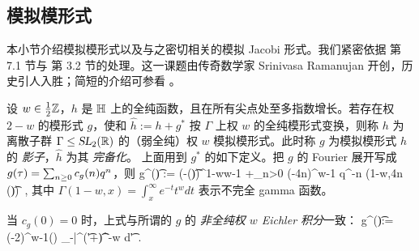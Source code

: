 \subsection{模拟模形式}
\label{subsec:MMF}

本小节介绍模拟模形式以及与之密切相关的模拟 Jacobi 形式。我们紧密依据 \cite{Dabholkar:2012nd} 第 7.1 节与 \cite{omjt} 第 3.2 节的处理。这一课题由传奇数学家 Srinivasa Ramanujan 开创，历史引人入胜；简短的介绍可参看 \cite{zagier_mock}。

设 $w\in \frac12\mathbb{Z}$，$h$ 是 $\mathbb{H}$ 上的全纯函数，且在所有尖点处至多指数增长。若存在权 $2-w$ 的模形式 $g$，使和 $\hat h:= h+ g^\ast$ 按 $\Gamma$ 上权 $w$ 的全纯模形式变换，则称 $h$ 为离散子群 $\Gamma \leq \operatorname{\textsl{SL}}_2(\mathbb{R})$ 的（弱全纯）权 $w$ 模拟模形式。此时称 $g$ 为模拟模形式 $h$ 的 {\em 影子}，$\hat h$ 为其 {\em 完备化}。
上面用到 $g^\ast$ 的如下定义。把 $g$ 的 Fourier 展开写成 $g(\tau) = \sum_{n\geq 0} c_g(n) q^n$，则
\be \label{def:int_shadow}
g^\ast(\t)  :=  {(-\Im(\t))^{1-w}\over w-1} +\sum_{n>0} (-4\p n)^{w-1} q^{-n} \Gamma(1-w,4\pi n \Im(\t))~,
\ee
其中 $\Gamma(1-w,x) = \int_{x}^{\infty} e^{-t} t^{w} dt$ 表示不完全 gamma 函数。



当 $c_g(0)=0$ 时，上式与所谓的 $g$ 的 {\em 非全纯权 $w$ Eichler 积分}一致：
\be\label{def:Eichler_integral}
g^\ast (\t):= (-2)^{w-1}\ex() \int_{-\bar \tau}^\inf (\t'+\t)^{-w}  {\rm d}\t'~. 
\ee


